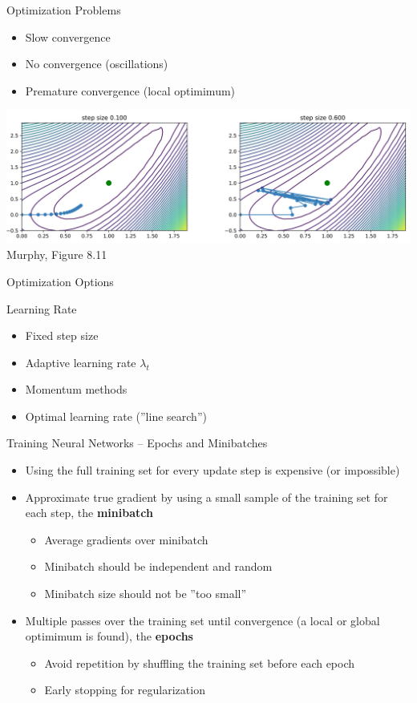 \documentclass[ignorenonframetext,xcolor=x11names]{beamer}
\begin{document}
\begin{frame}{Optimization Problems}
\begin{itemize}
   \item Slow convergence
   \item No convergence (oscillations)
   \item Premature convergence (local optimimum)
\end{itemize}
\centering
\includegraphics[width=\linewidth]{screen4} \\

\scriptsize Murphy, Figure 8.11
\end{frame}

\begin{frame}{Optimization Options}
\begin{block}{Learning Rate}
\begin{itemize}
   \item Fixed step size
   \item Adaptive learning rate $\lambda_t$
   \item Momentum methods
   \item Optimal learning rate (''line search'')
\end{itemize}
\end{block}
\end{frame}

\begin{frame}{Training Neural Networks -- Epochs and Minibatches}
\begin{itemize}
  \item Using the full training set for every update step is expensive (or impossible)
  \item Approximate true gradient by using a small sample of the training set for each step, the \textbf{minibatch}
  \begin{itemize}
     \item Average gradients over minibatch
     \item Minibatch should be independent and random
     \item Minibatch size should not be ''too small''
  \end{itemize}
  \item Multiple passes over the training set until convergence (a local or global optimimum is found), the \textbf{epochs}
  \begin{itemize}
     \item Avoid repetition by shuffling the training set before each epoch
     \item Early stopping for regularization
  \end{itemize}
\end{itemize}
\end{frame}
\end{document}
